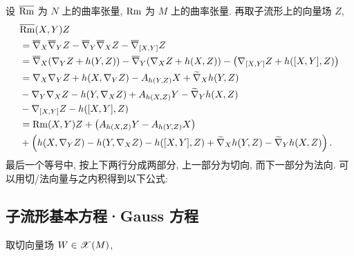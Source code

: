 \documentclass{ctexart}
\begin{document}
设 $\overline{\mathrm{Rm}}$ 为 $N$ 上的曲率张量, $\mathrm{Rm}$ 为 $M$ 上的曲率张量. 再取子流形上的向量场 $Z$,
\begin{align*}
	&\overline{\mathrm{Rm}}(X, Y)Z \\
	&= \overline{\nabla}_{X}{\overline{\nabla}_{Y}{Z}} - \overline{\nabla}_{Y}{\overline{\nabla}_{X}{Z}} - \overline{\nabla}_{[X, Y]}{Z} \\
	&= \overline{\nabla}_{X}{\left(\nabla_{Y}{Z} + h(Y, Z)\right)} - \overline{\nabla}_{Y}{\left(\nabla_{X}{Z} + h(X, Z)\right)} - \left(\nabla_{[X, Y]}{Z} + h([X, Y], Z)\right) \\
	&= \nabla_{X}{\nabla_{Y}{Z}} + h(X, \nabla_{Y}{Z}) - A_{h(Y, Z)}{X} + \widetilde{\nabla}_{X}{h(Y, Z)} \\
	&- \nabla_{Y}{\nabla_{X}{Z}} - h(Y, \nabla_{X}{Z}) + A_{h(X, Z)}{Y} - \widetilde{\nabla}_{Y}{h(X, Z)} \\
	&- \nabla_{[X, Y]}{Z} - h([X, Y], Z) \\
	&= \mathrm{Rm}(X, Y)Z + \left(A_{h(X, Z)}{Y} - A_{h(Y, Z)}{X}\right) \\
	&+ \left(h(X, \nabla_{Y}{Z}) - h(Y, \nabla_{X}{Z}) - h([X, Y], Z) + \widetilde{\nabla}_{X}{h(Y, Z)} - \widetilde{\nabla}_{Y}{h(X, Z)}\right).
\end{align*}
最后一个等号中, 按上下两行分成两部分, 上一部分为切向, 而下一部分为法向. 可以用切/法向量与之内积得到以下公式:

\subsection{子流形基本方程·Gauss 方程}
取切向量场 $W \in \mathscr{X}(M)$, 
\end{document}
